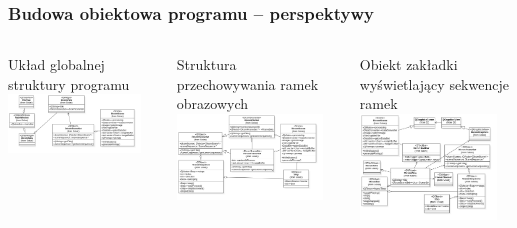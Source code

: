 \documentclass[aspectratio=169]{beamer}
\begin{document}
\begin{frame}
    \frametitle{Budowa obiektowa programu -- perspektywy}

    \begin{columns}[c]
        \def\umlsize{0.9\textwidth}
        \centering
        Układ globalnej struktury programu
        \includegraphics[width=\umlsize]{img/uml/global-sturcture.png}

        \vspace{-0.3cm}
        Struktura przechowywania ramek obrazowych
        \includegraphics[width=\umlsize]{img/uml/sokar-scene-sets.png}

        \centering
        Obiekt zakładki wyświetlający sekwencje ramek
        \includegraphics[width=\umlsize]{img/uml/dicom-view.png}

    \end{columns}

\end{frame}
\end{document}
